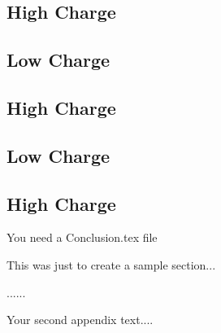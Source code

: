 \documentclass{iitthesis}
\begin{document}
\subsection{High Charge}

\subsection{Low Charge}
\subsection{High Charge}

\subsection{Low Charge}
\subsection{High Charge}

%   
You need a Conclusion.tex file




This was just to create a sample section...

\clearpage


%
%
\appendix


......



Your second appendix text....

\newpage
%
%


\end{document}
